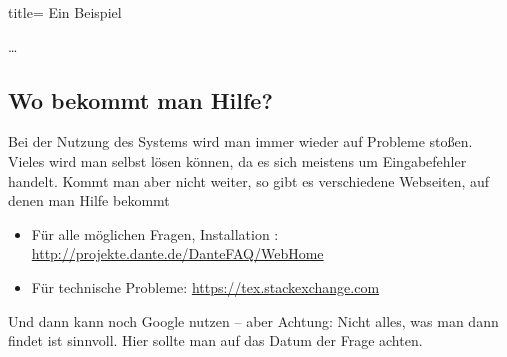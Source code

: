 %
\begin{tcblisting}{title= Ein Beispiel}
\begin{theorem}
\ldots
\end{theorem}
\end{tcblisting}
%
\subsection{Wo bekommt man Hilfe?}
%
Bei der Nutzung des Systems wird man immer wieder auf Probleme stoßen.
Vieles wird man selbst lösen können, da es sich meistens um Eingabefehler handelt.
Kommt man aber nicht weiter, so gibt es verschiedene Webseiten, auf denen man Hilfe bekommt

\begin{itemize}
\item
Für alle möglichen Fragen, Installation \ua: \url{http://projekte.dante.de/DanteFAQ/WebHome}
\item
Für technische Probleme: \url{https://tex.stackexchange.com}

\end{itemize}

Und dann kann noch Google nutzen -- aber Achtung: Nicht alles, was man dann findet ist sinnvoll.
Hier sollte man auf das Datum der Frage achten. 
